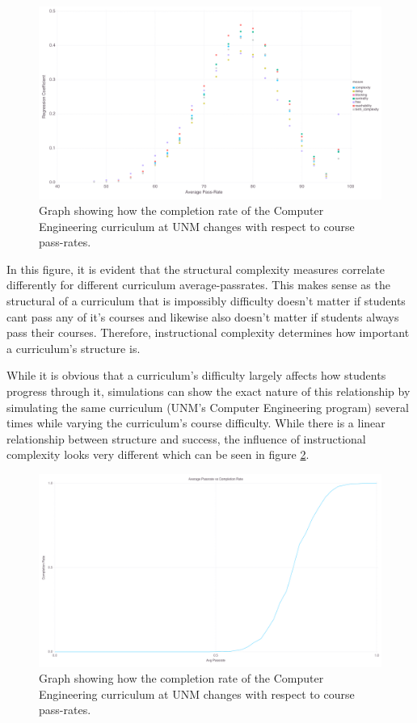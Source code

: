 \documentclass[botnum, fleqn]{unmeethesis}
\begin{document}
    \begin{figure}[h!]
      \centerline{\includegraphics[scale=0.2]{./figures/coef_gradRate10.png}}
      \caption{Graph showing how the completion rate of the Computer Engineering curriculum at UNM changes with respect to course pass-rates.} 
      \label{fig:coef}
    \end{figure}

    In this figure, it is evident that the structural complexity measures correlate differently for different curriculum average-passrates. This makes sense as the structural of a curriculum that is impossibly difficulty doesn't matter if students cant pass any of it's courses and likewise also doesn't matter if students always pass their courses. Therefore, instructional complexity determines how important a curriculum's structure is.

    While it is obvious that a curriculum's difficulty largely affects how students progress through it, simulations can show the exact nature of this relationship by simulating the same curriculum (UNM's Computer Engineering program) several times while varying the curriculum's course difficulty. While there is a linear relationship between structure and success, the influence of instructional complexity looks very different which can be seen in figure \ref{fig:instructional}.

    \begin{figure}[h!]
      \centerline{\includegraphics[scale=0.2]{./figures/instructional.png}}
      \caption{Graph showing how the completion rate of the Computer Engineering curriculum at UNM changes with respect to course pass-rates.} 
      \label{fig:instructional}
    \end{figure}
\end{document}

